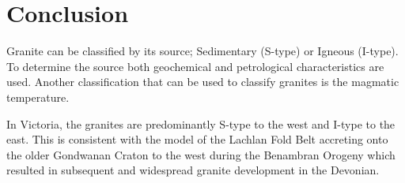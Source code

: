 \documentclass[a4paper]{article}
\begin{document}
\section{Conclusion}

Granite can be classified by its source; Sedimentary (S-type) or Igneous (I-type). To determine the source both geochemical and petrological characteristics are used.
Another classification that can be used to classify granites is the magmatic temperature.

In Victoria, the granites are predominantly S-type to the west and I-type to the east. This is consistent with the model of the Lachlan Fold Belt accreting onto the older Gondwanan Craton to the west during the Benambran Orogeny which resulted in subsequent and widespread granite development in the Devonian.
\newpage



\end{document}

